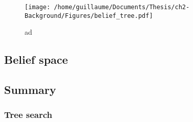 \begin{figure}[h]
 \centering
 \texttt{[image: /home/guillaume/Documents/Thesis/ch2-Background/Figures/belief\_tree.pdf]}
  \caption{ad}
\end{figure}














\subsection{Belief space}

%
%
%
\subsection{Summary}
%
%

\cite{Sol_POMDP_Policy_space_1998}

\subsubsection{Tree search}

